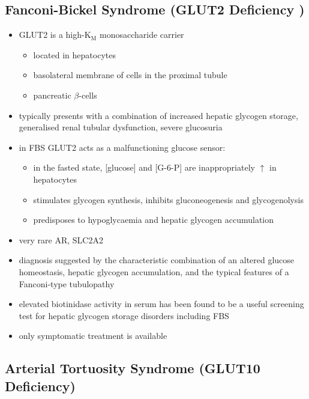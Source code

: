 \documentclass{scrartcl}
\begin{document}
\subsection{Fanconi-Bickel Syndrome (GLUT2 Deficiency )}
\label{sec:org7cae693}

\begin{itemize}
\item GLUT2 is a high-K\(_{\text{M}}\) monosaccharide carrier 
\begin{itemize}
\item located in hepatocytes
\item basolateral membrane of cells in the proximal tubule
\item pancreatic \(\beta\)-cells
\end{itemize}

\item typically presents with a combination of increased hepatic
glycogen storage, generalised renal tubular dysfunction, severe glucosuria

\item in FBS GLUT2 acts as a malfunctioning glucose sensor:
\begin{itemize}
\item in the fasted state, [glucose] and [G-6-P] are inappropriately \(\uparrow\) in hepatocytes
\item stimulates glycogen synthesis, inhibits gluconeogenesis and glycogenolysis
\item predisposes to hypoglycaemia and hepatic glycogen accumulation
\end{itemize}

\item very rare AR, SLC2A2

\item diagnosis suggested by the characteristic combination of an altered
glucose homeostasis, hepatic glycogen accumulation, and the typical
features of a Fanconi-type tubulopathy

\item elevated biotinidase activity in serum has been found to be a useful
screening test for hepatic glycogen storage disorders including FBS

\item only symptomatic treatment is available
\end{itemize}

\subsection{Arterial Tortuosity Syndrome (GLUT10 Deficiency)}
\label{sec:org4c5b0e2}
\end{document}
